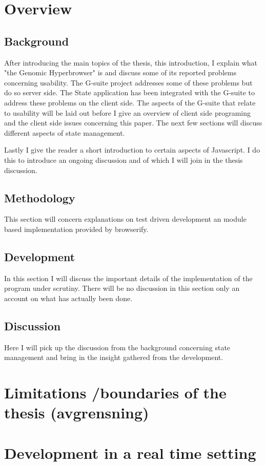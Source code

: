 \documentclass[english]{ifimaster}
\begin{document}
\section{Overview}
\subsection{Background}
After introducing the main topics of the thesis, this introduction, I explain what "the Genomic Hyperbrowser" is and discuss some of its reported problems concerning usability. The G-suite project addresses some of these problems but do so server side. The State application has been integrated with the G-suite to address these problems on the client side. The aspects of the G-suite that relate to usability will be laid out before I give an overview of client side programing and the client side issues concerning this paper. 
The next few sections will discuss different aspects of state management. 

Lastly I give the reader a short introduction to certain aspects of Javascript. I do this to introduce an ongoing discussion and of which I will join in the thesis discussion.
\subsection{Methodology}
This section will concern explanations on test driven development an module based implementation provided by browserify.
\subsection{Development}
In this section I will discuss the important details of the implementation of the program under scrutiny. There will be no discussion in this section only an account on what has actually been done.

\subsection{Discussion}
Here I will pick up the discussion from the background concerning state management and bring in the insight gathered from the development.
\section{Limitations /boundaries of the thesis (avgrensning)}

\section{Development in a real time setting}
\end{document}
